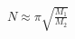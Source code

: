 \documentclass[preview]{standalone}
\begin{document}
\begin{align*}
N \approx \pi \sqrt{\frac{M_1}{M_2}}
\end{align*}
\end{document}

